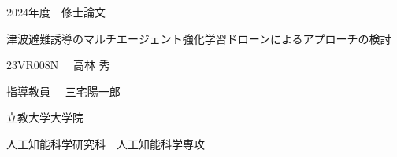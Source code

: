\documentclass[a4paper, 12pt]{bxjsreport}
\begin{document}
\begin{titlepage}
    \begin{center}

        

        \vspace{50truept}


        



        {\headfont \Large 2024年度　修士論文}
        \vspace{20truept}

        {\headfont \Huge 津波避難誘導のマルチエージェント強化学習ドローンによるアプローチの検討}
        \vspace{160truept}
        
        {\headfont \Large 23VR008N　 \LARGE 高林 秀}\\ \vspace{10truept}
        
        \vspace{20truept}

        {\headfont \Large 指導教員　 三宅陽一郎}
        
        \vspace{100truept}

        {\headfont \Large 立教大学大学院}
        
        \vspace{10truept}
        
        {\headfont \Large 人工知能科学研究科　人工知能科学専攻}

    \end{center}
\end{titlepage}
\end{document}
